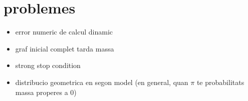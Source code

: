 \section{problemes}
\begin{itemize}
\item error numeric de calcul dinamic
\item graf inicial complet tarda massa
\item strong stop condition
\item distribucio geometrica en segon model (en general, quan $\pi$ te probabilitats massa properes a 0)
\end{itemize}


